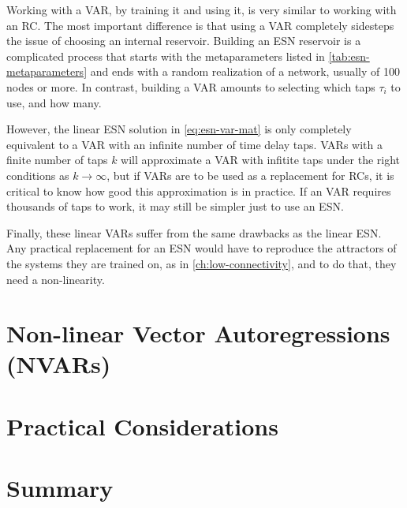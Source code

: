 Working with a VAR, by training it and using it, is very similar to
working with an RC. The most important difference is that using a VAR
completely sidesteps the issue of choosing an internal
reservoir. Building an ESN reservoir is a complicated process that
starts with the metaparameters listed in \cref{tab:esn-metaparameters}
and ends with a random realization of a network, usually of 100 nodes
or more. In contrast, building a VAR amounts to selecting which taps
$\tau_i$ to use, and how many.

However, the linear ESN solution in \cref{eq:esn-var-mat} is only
completely equivalent to a VAR with an infinite number of time delay
taps. VARs with a finite number of taps $k$ will approximate a VAR
with infitite taps under the right conditions as $k \rightarrow
\infty$\cite{bollt2021}, but if VARs are to be used as a replacement
for RCs, it is critical to know how good this approximation is in
practice. If an VAR requires thousands of taps to work, it may still
be simpler just to use an ESN.

Finally, these linear VARs suffer from the same drawbacks as the
linear ESN. Any practical replacement for an ESN would have to
reproduce the attractors of the systems they are trained on, as in
\cref{ch:low-connectivity}, and to do that, they need a non-linearity.

\section{Non-linear Vector Autoregressions (NVARs)}


\section{Practical Considerations}


\section{Summary}

